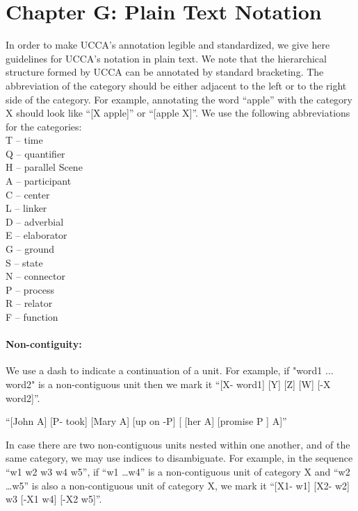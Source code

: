\documentclass[11pt]{article}
\newcommand{\dd}[1]{{\color{blue}{#1}}}
\newcommand{\oa}[1]{{\color{blue}{OA: #1}}}
\begin{document}
\section{Chapter G: Plain Text Notation}


In order to make UCCA's annotation legible and standardized, we give here guidelines for UCCA's notation in plain text. We note that the hierarchical structure formed by UCCA can be annotated by standard bracketing. The abbreviation of the category should be either adjacent to the left or to the right side of the category.
For example, annotating the word ``apple'' with the category X should look like ``[X apple]'' or ``[apple X]''.
We use the following abbreviations for the categories:\\

\noindent
T -- time \\
Q -- quantifier\\
H -- parallel Scene \\
A -- participant \\
C -- center \\
L -- linker\\
D -- adverbial\\
E -- elaborator\\
G -- ground\\
S -- state\\
N -- connector\\
P -- process\\
R -- relator\\
F -- function\\


\paragraph{Non-contiguity:} We use a dash to indicate a continuation of a unit. For example, if "word1 $\ldots$ word2" is a non-contiguous unit then we mark it ``[X- word1] [Y] [Z] [W] [-X word2]''.

``[John A] [P- took] [Mary A] [up on -P] [ [her A] [promise P ] A]''


In case there are two non-contiguous units nested within one another, and of the same category, we may use indices to disambiguate. For example, in the sequence ``w1 w2 w3 w4 w5'', if ``w1 \ldots w4'' is a non-contiguous unit of category X and ``w2 \ldots w5'' is also a non-contiguous unit of category X, we mark it ``[X1- w1] [X2- w2] w3 [-X1 w4] [-X2 w5]''.
\end{document}
